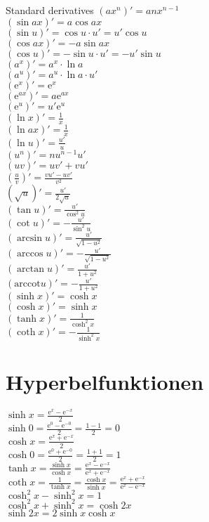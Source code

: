 \documentclass[a4paper, 10pt]{scrartcl}
\newcommand*\euler{\mathrm{e}}
\newcommand*\arccot{\mathrm{arccot}}
\begin{document}
Standard derivatives
$(ax^{n})' = anx^{n-1}$\\
$(\sin{ax})' = a\cos{ax}$\\
$(\sin{u})' = \cos{u}\cdot u' = u'\cos{u}$\\
$(\cos{ax})' = -a\sin{ax}$\\
$(\cos{u})' = -\sin{u}\cdot u' = -u'\sin{u}$\\
$(a^{x})' = a^{x}\cdot\ln{a}$\\
$(a^{u})' = a^{u}\cdot\ln{a}\cdot u'$\\
$(\euler^{x})' = \euler^{x}$\\
$(\euler^{ax})' = a\euler^{ax}$\\
$(\euler^{u})' = u'\euler^{u}$\\
$(\ln{x})' = \frac{1}{x}$\\
$(\ln{ax})' = \frac{1}{x}$\\
$(\ln{u})' = \frac{u'}{u}$\\
$(u^{n})' = nu^{n-1}u'$\\
$(uv)' = uv' + vu'$\\
$\left(\frac{u}{v}\right)' = \frac{vu' - uv'}{v^{2}}$\\
$\left(\sqrt{u}\right)' = \frac{u'}{2\sqrt{u}}$\\
$(\tan{u})' = \frac{u'}{\cos^{2}{u}}$\\
$(\cot{u})' = -\frac{u'}{\sin^{2}{u}}$\\
$(\arcsin{u})' = \frac{u'}{\sqrt{1 - u^{2}}}$\\
$(\arccos{u})' = -\frac{u'}{\sqrt{1 - u^{2}}}$\\
$(\arctan{u})' = \frac{u'}{1 + u^{2}}$\\
$(\arccot{u})' = -\frac{u'}{1 + u^{2}}$\\
$(\sinh{x})' = \cosh{x}$\\
$(\cosh{x})' = \sinh{x}$\\
$(\tanh{x})' = \frac{1}{\cosh^{2}{x}}$\\
$(\coth{x})' = -\frac{1}{\sinh^{2}{x}}$\\

\section*{Hyperbelfunktionen}
$\sinh{x} = \frac{\euler^{x} - \euler^{-x}}{2}$\\
$\sinh{0} = \frac{\euler^{0} - \euler^{-0}}{2} = \frac{1 - 1}{2} = 0$\\
$\cosh{x} = \frac{\euler^{x} + \euler^{-x}}{2}$\\
$\cosh{0} = \frac{\euler^{0} + \euler^{-0}}{2} = \frac{1 + 1}{2} = 1$\\
$\tanh{x} = \frac{\sinh{x}}{\cosh{x}} = \frac{\euler^{x} - \euler^{-x}}{\euler^{x} + \euler^{-x}}$\\
$\coth{x} = \frac{1}{\tanh{x}} = \frac{\cosh{x}}{\sinh{x}} = \frac{\euler^{x} + \euler^{-x}}{\euler^{x} - \euler^{-x}}$\\
$\cosh^{2}{x} - \sinh^{2}{x} = 1$\\
$\cosh^{2}{x} + \sinh^{2}{x} = \cosh{2x}$\\
$\sinh{2x} = 2\sinh{x}\cosh{x}$\\
\end{document}
